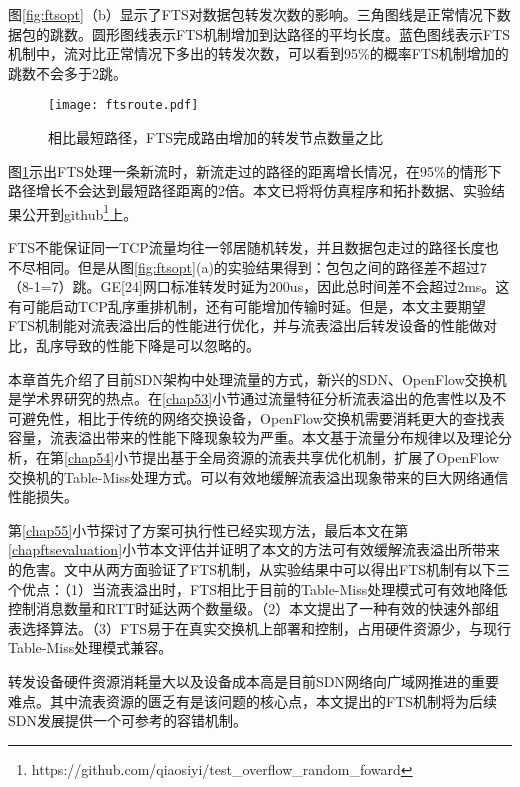 图\ref{fig:ftsopt}（b）显示了FTS对数据包转发次数的影响。三角图线是正常情况下数据包的跳数。圆形图线表示FTS机制增加到达路径的平均长度。蓝色图线表示FTS机制中，流对比正常情况下多出的转发次数，可以看到95\%的概率FTS机制增加的跳数不会多于2跳。

\begin{figure}[!ht]
	\centering 
	\vspace{-1.5mm} 
	\texttt{[image: ftsroute.pdf]}
	\caption{相比最短路径，FTS完成路由增加的转发节点数量之比} \label{fig:ftsroute}
\end{figure}

图\ref{fig:ftsroute}示出FTS处理一条新流时，新流走过的路径的距离增长情况，在95\%的情形下路径增长不会达到最短路径距离的2倍。本文已将将仿真程序和拓扑数据、实验结果公开到github\footnote{https://github.com/qiaosiyi/test\_overflow\_random\_foward}上。



FTS不能保证同一TCP流量均往一邻居随机转发，并且数据包走过的路径长度也不尽相同。但是从图\ref{fig:ftsopt}(a)的实验结果得到：包包之间的路径差不超过7（8-1=7）跳。GE[24]网口标准转发时延为200us，因此总时间差不会超过2ms。这有可能启动TCP乱序重排机制，还有可能增加传输时延。但是，本文主要期望FTS机制能对流表溢出后的性能进行优化，并与流表溢出后转发设备的性能做对比，乱序导致的性能下降是可以忽略的。


本章首先介绍了目前SDN架构中处理流量的方式，新兴的SDN、OpenFlow交换机是学术界研究的热点。在\ref{chap53}小节通过流量特征分析流表溢出的危害性以及不可避免性，相比于传统的网络交换设备，OpenFlow交换机需要消耗更大的查找表容量，流表溢出带来的性能下降现象较为严重。本文基于流量分布规律以及理论分析，在第\ref{chap54}小节提出基于全局资源的流表共享优化机制，扩展了OpenFlow交换机的Table-Miss处理方式。可以有效地缓解流表溢出现象带来的巨大网络通信性能损失。

第\ref{chap55}小节探讨了方案可执行性已经实现方法，最后本文在第\ref{chapftsevaluation}小节本文评估并证明了本文的方法可有效缓解流表溢出所带来的危害。文中从两方面验证了FTS机制，从实验结果中可以得出FTS机制有以下三个优点：（1）当流表溢出时，FTS相比于目前的Table-Miss处理模式可有效地降低控制消息数量和RTT时延达两个数量级。（2）本文提出了一种有效的快速外部组表选择算法。（3）FTS易于在真实交换机上部署和控制，占用硬件资源少，与现行Table-Miss处理模式兼容。

转发设备硬件资源消耗量大以及设备成本高是目前SDN网络向广域网推进的重要难点。其中流表资源的匮乏有是该问题的核心点，本文提出的FTS机制将为后续SDN发展提供一个可参考的容错机制。






